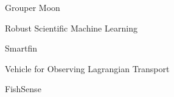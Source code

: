 \item Grouper Moon
\item Robust Scientific Machine Learning
\item Smartfin
\item Vehicle for Observing Lagrangian Transport
\item FishSense
